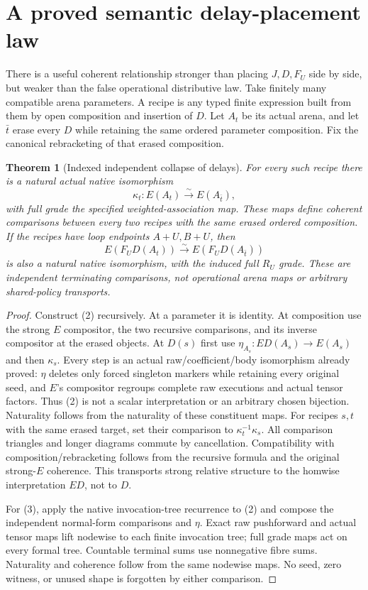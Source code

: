 \documentclass[11pt]{article}
\newtheorem{theorem}{Theorem}\newtheorem{proposition}{Proposition}
\begin{document}
\section{A proved semantic delay-placement law}
There is a useful coherent relationship stronger than placing $J,D,F_U$
side by side, but weaker than the false operational distributive law.
Take finitely many compatible arena parameters. A recipe is any typed finite
expression built from them by open composition and insertion of $D$.
Let $A_t$ be its actual arena, and let $\bar t$ erase every $D$ while retaining
the same ordered parameter composition. Fix the canonical rebracketing of
that erased composition.
\begin{theorem}[Indexed independent collapse of delays]
For every such recipe there is a natural actual native isomorphism
\[
 \kappa_t:E(A_t)\xrightarrow{\sim}E(A_{\bar t}),             \tag{2}
\]
with full grade the specified weighted-association map. These maps define
coherent comparisons between every two recipes with the same erased ordered
composition. If the recipes have loop endpoints $A+U,B+U$, then
\[
 E(F_U D(A_t))\xrightarrow{\sim}E(F_U D(A_{\bar t}))         \tag{3}
\]
is also a natural native isomorphism, with the induced full $R_U$ grade.
These are independent terminating comparisons, not operational arena maps
or arbitrary shared-policy transports.
\end{theorem}
\begin{proof}
Construct (2) recursively. At a parameter it is identity. At composition
use the strong $E$ compositor, the two recursive comparisons, and its inverse
compositor at the erased objects. At $D(s)$ first use
$\eta_{A_s}:E D(A_s)\to E(A_s)$ and then $\kappa_s$.
Every step is an actual raw/coefficient/body isomorphism already proved:
$\eta$ deletes only forced singleton markers while retaining every original
seed, and $E$'s compositor regroups complete raw executions and actual tensor
factors. Thus (2) is not a scalar interpretation or an arbitrary chosen
bijection. Naturality follows from the naturality of these constituent maps.
For recipes $s,t$ with the same erased target, set their comparison to
$\kappa_t^{-1}\kappa_s$. All comparison triangles and longer diagrams commute
by cancellation. Compatibility with composition/rebracketing follows from
the recursive formula and the original strong-$E$ coherence. This transports
strong relative structure to the homwise interpretation $E D$, not to $D$.

For (3), apply the native invocation-tree recurrence to (2) and compose the
independent normal-form comparisons and $\eta$. Exact raw pushforward and
actual tensor maps lift nodewise to each finite invocation tree; full grade
maps act on every formal tree. Countable terminal sums use nonnegative fibre
sums. Naturality and coherence follow from the same nodewise maps. No seed,
zero witness, or unused shape is forgotten by either comparison.
\end{proof}
\end{document}
